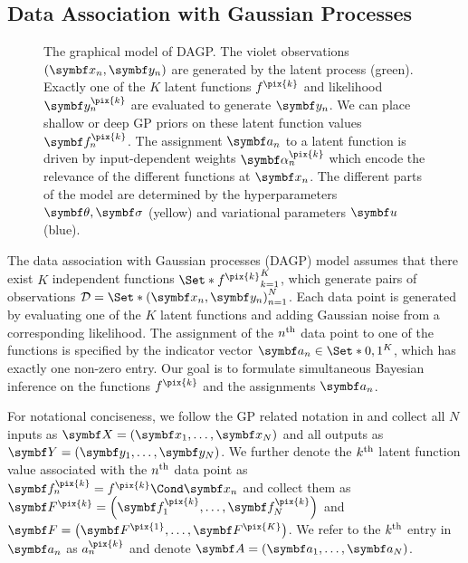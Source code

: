 \subsection{Data Association with Gaussian Processes}
\label{sub:data_association:model}
\begin{figure}[t]
    \centering
    
    \caption{
    \label{fig:data_association:data_association_graphical_model}
    The graphical model of DAGP.
    The violet observations $(\mat{x_n}, \mat{y_n})$ are generated by the latent process (green).
    Exactly one of the $K$ latent functions $f^{\pix{k}}$ and likelihood $\mat{y_n^{\pix{k}}}$ are evaluated to generate $\mat{y_n}$.
    We can place shallow or deep GP priors on these latent function values $\mat{f_n^{\pix{k}}}$.
    The assignment $\mat{a_n}$ to a latent function is driven by input-dependent weights $\mat{\alpha_n^{\pix{k}}}$ which encode the relevance of the different functions at $\mat{x_n}$.
    The different parts of the model are determined by the hyperparameters $\mat{\theta}, \mat{\sigma}$ (yellow) and variational parameters $\mat{u}$ (blue).
    }
\end{figure}
The data association with Gaussian processes (DAGP) model assumes that there exist $K$ independent functions $\Set*{f^{\pix{k}}}_{k=1}^K$, which generate pairs of observations $\Dc = \Set*{(\mat{x_n}, \mat{y_n})}_{n=1}^N$.
Each data point is generated by evaluating one of the $K$ latent functions and adding Gaussian noise from a corresponding likelihood.
The assignment of the $n^{\text{th}}$ data point to one of the functions is specified by the indicator vector $\mat{a_n} \in \Set*{0, 1}^K$, which has exactly one non-zero entry.
Our goal is to formulate simultaneous Bayesian inference on the functions $f^{\pix{k}}$ and the assignments $\mat{a_n}$.

For notational conciseness, we follow the GP related notation in \parencite{hensman_scalable_2015} and collect all $N$ inputs as $\mat{X} = \left(\mat{x_1}, \ldots, \mat{x_N}\right)$ and all outputs as $\mat{Y} = \left(\mat{y_1}, \ldots, \mat{y_N}\right)$.
We further denote the $k^{\text{th}}$ latent function value associated with the $n^{\text{th}}$ data point as $\rv{f_n^{\pix{k}}} = \Fun{f^{\pix{k}}}{\mat{x_n}}$ and collect them as $\mat{F^{\pix{k}}} = \left( \rv{f_1^{\pix{k}}}, \ldots, \rv{f_N^{\pix{k}}} \right)$ and $\mat{F} = \left( \mat{F^{\pix{1}}}, \ldots, \mat{F^{\pix{K}}} \right)$.
We refer to the $k^{\text{th}}$ entry in $\mat{a_n}$ as $a_n^{\pix{k}}$ and denote $\mat{A} = \left(\mat{a_1}, \ldots, \mat{a_N}\right)$.

